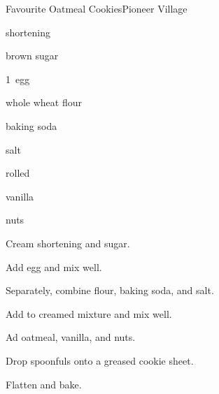 \begin{recipe}{Favourite Oatmeal Cookies\FIXME}{Pioneer Village}{}

\begin{ingredients}
\item {} shortening
\item {} brown sugar
\item 1~egg
\item \C{1\half} whole wheat flour
\item {} baking soda
\item \tp{\quarter} salt
\item \C{1\half} rolled 
\item {} vanilla
\item \C{\quarter} nuts
\end{ingredients}

\begin{directions}
\item Cream shortening and sugar.
\item Add egg and mix well.
\item Separately, combine flour, baking soda, and salt.
\item Add to creamed mixture and mix well.
\item Ad oatmeal, vanilla, and nuts.
\item Drop spoonfuls onto a greased cookie sheet.
\item Flatten and bake.
\end{directions}

\end{recipe}
